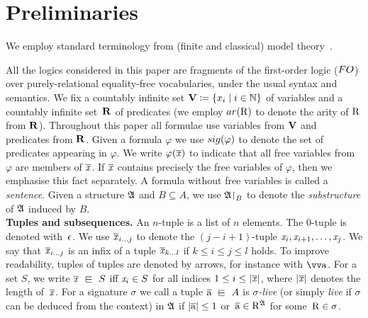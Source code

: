 
\section{Preliminaries}\label{sec:preliminaries}
We employ standard terminology from (finite and classical) model theory~\cite[Sec. 1--3]{Libkin04}.

All the logics considered in this paper are fragments of the first-order logic ($\FO$) over purely-relational equality-free vocabularies, under the usual syntax and semantics. 
We fix a countably infinite set $\mathbf{V} \coloneqq \{x_i \mid i \in {\mathbb{N}}\}$ of variables and a countably infinite set~$\mathbf{R}$ of predicates (we employ $\arity(\relR)$ to denote the arity of $\mathrm{R}$ from $\mathbf{R}$). 
Throughout this paper all formulae use variables from $\mathbf{V}$ and predicates from $\mathbf{R}$.
Given a formula $\varphi$ we use $\sig(\varphi)$ to denote the set of predicates appearing in $\varphi$. 
We write $\varphi(\overline{\mathit{x}})$ to indicate that all free variables from $\varphi$ are members of $\overline{\mathit{x}}$. 
If $\overline{\mathit{x}}$ contains precisely the free
variables of $\varphi$, then we emphasise this fact separately.
A formula without free variables is called a \emph{sentence}.
Given a structure ${\mathfrak{A}}$ and $B \subseteq A$, we use ${\mathfrak{A}}\mathord{\upharpoonright}_{B}$ to denote the \emph{substructure} of ${\mathfrak{A}}$ induced by $B$.\\

\noindent \textbf{Tuples and subsequences.}
An $n$-tuple is a list of $n$ elements. The $0$-tuple is denoted with~$\epsilon$.
We use $\overline{\mathit{x}}_{i\ldots j}$ to denote the $(j{-}i{+}1)$-tuple $\mathit{x}_i, \mathit{x}_{i+1}, \ldots, \mathit{x}_j$.
We say that $\overline{\mathit{x}}_{i\ldots j}$ is an infix of a tuple $\overline{\mathit{x}}_{k\ldots l}$ if $k \leq i \leq j \leq l$ holds. 
To improve readability, tuples of tuples are denoted by arrows, for instance with $\elemtuptuplea$.
For a set $S$, we write $\vartuplex \sqin S$ iff $\mathit{x}_i \in S$ for all indices $1 \leq i \leq |\overline{\mathit{x}}|$, where $|\overline{\mathit{x}}|$ denotes the length of~$\overline{\mathit{x}}$. 
For a signature $\sigma$ we call a tuple $\elemtuplea \sqin A$ is \emph{$\sigma$-live} (or simply \emph{live} if $\sigma$ can be deduced from the context) in ${\mathfrak{A}}$ if $|\overline{\mathrm{a}}| \leq 1$ or~$\overline{\mathrm{a}} \in \mathrm{R}^{{\mathfrak{A}}}$ for some~$\mathrm{R} \in \sigma$.\\ 

